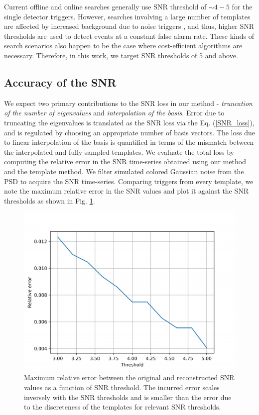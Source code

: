 Current offline and online searches \cite{pycbc_offline, pycbc-live} generally use SNR threshold of $\sim 4-5$ for the single detector triggers. However, searches involving a large number of templates are affected by increased background due to noise triggers \cite{ianharry_precession, Nitz_ecc_search}, and thus, higher SNR thresholds are used to detect events at a constant false alarm rate. These kinds of search scenarios also happen to be the case where cost-efficient algorithms are necessary. Therefore, in this work, we target SNR thresholds of 5 and above. 

\subsection{Accuracy of the SNR}
We expect two primary contributions to the SNR loss in our method - \textit{truncation of the number of eigenvalues} and \textit{interpolation of the basis}. Error due to truncating the eigenvalues is translated as the SNR loss via the Eq. (\ref{SNR_loss}), and is regulated by choosing an appropriate number of basis vectors. The loss due to linear interpolation of the basis is quantified in terms of the mismatch between the interpolated and fully sampled templates. We evaluate the total loss by computing the relative error in the SNR time-series obtained using our method and the template method. We filter simulated colored Gaussian noise from the PSD to acquire the SNR time-series. Comparing triggers from every template, we note the maximum relative error in the SNR values and plot it against the SNR thresholds as shown in Fig. \ref{relative_error}.
\begin{figure}
    \centering
    \includegraphics[width=\linewidth]{figures/Hierarchical_MF/Rel_err.pdf}
    \caption{Maximum relative error between the original and reconstructed SNR values as a function of SNR threshold. The incurred error scales inversely with the SNR thresholds and is smaller than the error due to the discreteness of the templates for relevant SNR thresholds.}
    \label{relative_error}
\end{figure}

